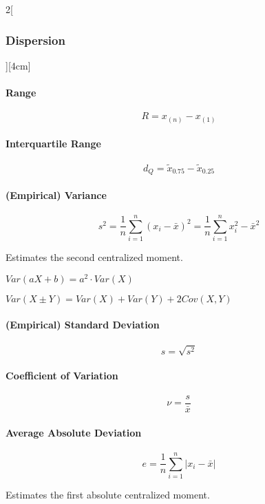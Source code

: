 \documentclass[8pt]{extarticle}
\begin{document}
\begin{multicols}{2}[\subsubsection{Dispersion}][4cm] 

\paragraph{Range}

$$R=x_{(n)}-x_{(1)}$$

\paragraph{Interquartile Range}

$$d_Q=\tilde{x}_{0.75}-\tilde{x}_{0.25}$$

\paragraph{(Empirical) Variance}

$$s^2=\frac{1}{n}\sum\limits_{i=1}^n(x_i-\bar{x})^2=\frac{1}{n}\sum\limits_{i=1}^nx_i^2-\bar{x}^2$$

\noindent Estimates the second centralized moment.

\begin{Rechreg}
\item $Var(aX+b)=a^2\cdot Var(X)$
\item $Var(X\pm Y)= Var(X)+Var(Y) + 2Cov(X,Y)$
\end{Rechreg}

\paragraph{(Empirical) Standard Deviation}

$$s=\sqrt{s^2}$$

\paragraph{Coefficient of Variation}

$$ \nu=\frac{s}{\bar{x}}$$

\paragraph{Average Absolute Deviation}


$$ \mathit{e} = \frac{1}{n}\sum_{i=1}^n \left|x_i - \bar{x}\right|$$

\noindent Estimates the first absolute centralized moment.

\end{multicols}
\end{document}
